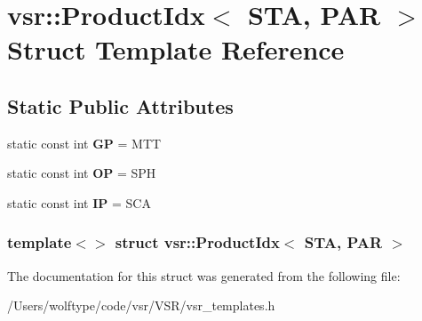 \hypertarget{structvsr_1_1_product_idx_3_01_s_t_a_00_01_p_a_r_01_4}{\section{vsr\-:\-:Product\-Idx$<$ S\-T\-A, P\-A\-R $>$ Struct Template Reference}
\label{structvsr_1_1_product_idx_3_01_s_t_a_00_01_p_a_r_01_4}
}
\subsection*{Static Public Attributes}
\begin{DoxyCompactItemize}
\item 
\hypertarget{structvsr_1_1_product_idx_3_01_s_t_a_00_01_p_a_r_01_4_a5da544196d3bca83d89b8a7cb243aa93}{static const int {\bfseries G\-P} = M\-T\-T}\label{structvsr_1_1_product_idx_3_01_s_t_a_00_01_p_a_r_01_4_a5da544196d3bca83d89b8a7cb243aa93}

\item 
\hypertarget{structvsr_1_1_product_idx_3_01_s_t_a_00_01_p_a_r_01_4_ae2114ce0d844199b11d35b149c1f5611}{static const int {\bfseries O\-P} = S\-P\-H}\label{structvsr_1_1_product_idx_3_01_s_t_a_00_01_p_a_r_01_4_ae2114ce0d844199b11d35b149c1f5611}

\item 
\hypertarget{structvsr_1_1_product_idx_3_01_s_t_a_00_01_p_a_r_01_4_a83ea3143707c74fe8b1e04945e8e5b08}{static const int {\bfseries I\-P} = S\-C\-A}\label{structvsr_1_1_product_idx_3_01_s_t_a_00_01_p_a_r_01_4_a83ea3143707c74fe8b1e04945e8e5b08}

\end{DoxyCompactItemize}
\subsubsection*{template$<$$>$ struct vsr\-::\-Product\-Idx$<$ S\-T\-A, P\-A\-R $>$}



The documentation for this struct was generated from the following file\-:\begin{DoxyCompactItemize}
\item 
/\-Users/wolftype/code/vsr/\-V\-S\-R/vsr\-\_\-templates.\-h\end{DoxyCompactItemize}
